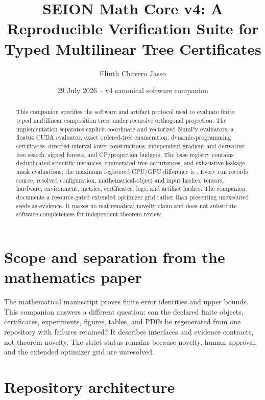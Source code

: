 \documentclass[11pt]{amsart}
\title[Typed tree verification software]{SEION Math Core v4: A Reproducible Verification Suite for Typed Multilinear Tree Certificates}
\author{Eliuth Chavero Jasso}
\date{29 July 2026 -- v4 canonical software companion}
\begin{document}
\begin{abstract}
This companion specifies the software and artifact protocol used to evaluate finite typed multilinear composition trees under recursive orthogonal projection.  The implementation separates explicit-coordinate and vectorized NumPy evaluators, a float64 CUDA evaluator, exact ordered-tree enumeration, dynamic-programming certificates, directed interval lower constructions, independent gradient and derivative-free search, signed forests, and CP/projection budgets.  The base registry contains \VThreeScientificInstances{} deduplicated scientific instances, \VThreeTreeOccurrences{} enumerated tree occurrences, and \VThreeLeakageMasks{} exhaustive leakage-mask evaluations; the maximum registered CPU/GPU difference is \VThreeMaxParity{}.  Every run records source, resolved configuration, mathematical-object and input hashes, tensors, hardware, environment, metrics, certificates, logs, and artifact hashes.  The companion documents a resource-gated extended optimizer grid rather than presenting unexecuted seeds as evidence.  It makes no mathematical novelty claim and does not substitute software completeness for independent theorem review.
\end{abstract}

\maketitle

\section{Scope and separation from the mathematics paper}

The mathematical manuscript proves finite error identities and upper bounds.
This companion answers a different question: can the declared finite objects,
certificates, experiments, figures, tables, and PDFs be regenerated from one
repository with failures retained?  It describes interfaces and evidence
contracts, not theorem novelty.  The strict status remains
\VThreeReleaseStatus{} because novelty, human approval, and the extended
optimizer grid are unresolved.

\section{Repository architecture}
\end{document}
